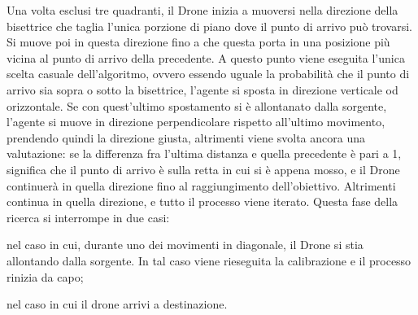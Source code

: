 Una volta esclusi tre quadranti, il Drone inizia a muoversi nella direzione della bisettrice che taglia l'unica porzione di piano dove il punto di arrivo può trovarsi. Si muove poi in questa direzione fino a che questa porta in una posizione più vicina al punto di arrivo della precedente. A questo punto viene eseguita l'unica scelta casuale dell'algoritmo, ovvero essendo uguale la probabilità che il punto di arrivo sia sopra o sotto la bisettrice, l'agente si sposta in direzione verticale od orizzontale. Se con quest'ultimo spostamento si è allontanato dalla sorgente, l'agente si muove in direzione perpendicolare rispetto all'ultimo movimento, prendendo quindi la direzione giusta, altrimenti viene svolta ancora una valutazione: se la differenza fra l'ultima distanza e quella precedente è pari a 1, significa che il punto di arrivo è sulla retta in cui si è appena mosso, e il Drone continuerà in quella direzione fino al raggiungimento dell'obiettivo. Altrimenti continua in quella direzione, e tutto il processo viene iterato. Questa fase della ricerca si interrompe in due casi: 

nel caso in cui, durante uno dei movimenti in diagonale, il Drone si stia allontando dalla sorgente. In tal caso viene rieseguita la calibrazione e il processo rinizia da capo;

nel caso in cui il drone arrivi a destinazione.
